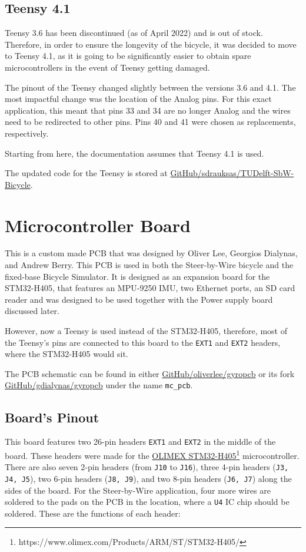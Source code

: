 \subsection{Teensy 4.1}
Teensy 3.6 has been discontinued (as of April 2022) and is out of stock. Therefore, in order to ensure the longevity of the bicycle, it was decided to move to Teensy 4.1, as it is going to be significantly easier to obtain spare microcontrollers in the event of Teensy getting damaged.

The pinout of the Teensy changed slightly between the versions 3.6 and 4.1. The most impactful change was the location of the Analog pins. For this exact application, this meant that pins 33 and 34 are no longer Analog and the wires need to be redirected to other pins. Pins 40 and 41 were chosen as replacements, respectively.

Starting from here, the documentation assumes that Teensy 4.1 is used.

The updated code for the Teensy is stored at \href{https://github.com/sdrauksas/TUDelft-SbW-Bicycle}{GitHub/sdrauksas/TUDelft-SbW-Bicycle}.


\section{Microcontroller Board}
This is a custom made PCB that was designed by Oliver Lee, Georgios Dialynas, and Andrew Berry. This PCB is used in both the Steer-by-Wire bicycle and the fixed-base Bicycle Simulator. It is designed as an expansion board for the STM32-H405, that features an MPU-9250 IMU, two Ethernet ports, an SD card reader and was designed to be used together with the Power supply board discussed later.

However, now a Teensy is used instead of the STM32-H405, therefore, most of the Teensy's pins are connected to this board to the \verb|EXT1| and \verb|EXT2| headers, where the STM32-H405 would sit.

The PCB schematic can be found in either \href{https://github.com/oliverlee/gyropcb}{GitHub/oliverlee/gyropcb} or its fork \href{https://github.com/gdialynas/gyropcb}{GitHub/gdialynas/gyropcb} under the name \verb|mc_pcb|.

\subsection{Board's Pinout}
This board features two 26-pin headers \verb|EXT1| and \verb|EXT2| in the middle of the board. These headers were made for the \href{https://www.olimex.com/Products/ARM/ST/STM32-H405/}{OLIMEX STM32-H405}\footnote{https://www.olimex.com/Products/ARM/ST/STM32-H405/} microcontroller. There are also seven 2-pin headers (from \verb|J10| to \verb|J16|), three 4-pin headers (\verb|J3, J4, J5|), two 6-pin headers (\verb|J8, J9|), and two 8-pin headers (\verb|J6, J7|) along the sides of the board. For the Steer-by-Wire application, four more wires are soldered to the pads on the PCB in the location, where a \verb|U4| IC chip should be soldered. These are the functions of each header:

